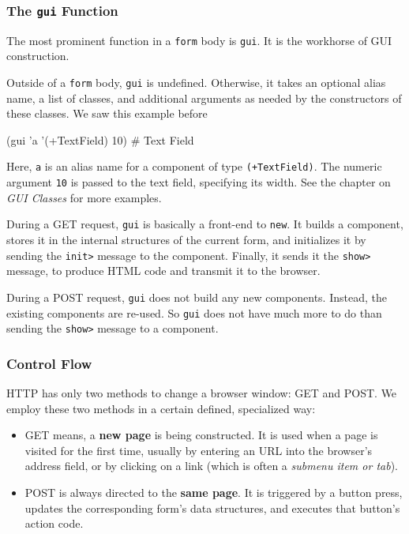\subsubsection{ The \texttt{gui} Function}
\label{sec:appl-devel-the-gui}%

The most prominent function in a \texttt{form} body is \texttt{gui}. It is the
workhorse of GUI construction.

Outside of a \texttt{form} body, \texttt{gui} is undefined. Otherwise, it takes an
optional alias name, a list of classes, and additional arguments as
needed by the constructors of these classes. We saw this example before


\begin{wideverbatim}
(gui 'a '(+TextField) 10)                 # Text Field
\end{wideverbatim}

Here,  \texttt{a}  is an alias name for a component of type \texttt{(+TextField)}. The
numeric argument \texttt{10} is passed to the text field, specifying its width.
See the chapter on \emph{GUI Classes} for more examples.

During a GET request, \texttt{gui} is basically a front-end to \texttt{new}. It builds
a component, stores it in the internal structures of the current form,
and initializes it by sending the \texttt{init>} message to the component.
Finally, it sends it the \texttt{show>} message, to produce HTML code and
transmit it to the browser.

During a POST request, \texttt{gui} does not build any new components. Instead,
the existing components are re-used. So \texttt{gui} does not have much more to
do than sending the \texttt{show>} message to a component.

\subsubsection{ Control Flow}
\label{sec:appl-devel-control-flow}%

HTTP has only two methods to change a browser window: GET and POST. We
employ these two methods in a certain defined, specialized way:

\begin{itemize}
\item GET means, a \textbf{new page} is being constructed. It is used when a page
   is visited for the first time, usually by entering an URL into the
   browser's address field, or by clicking on a link (which is often a
   \emph{submenu item or tab}).
\item POST is always directed to the \textbf{same page}. It is triggered by a
   button press, updates the corresponding form's data structures, and
   executes that button's action code.
\end{itemize}

